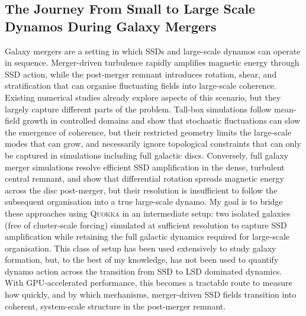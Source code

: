 \subsection{The Journey From Small to Large Scale Dynamos During Galaxy Mergers}

Galaxy mergers are a setting in which SSDs and large-scale dynamos can operate in sequence. Merger-driven turbulence rapidly amplifies magnetic energy through SSD action, while the post-merger remnant introduces rotation, shear, and stratification that can organise fluctuating fields into large-scale coherence. Existing numerical studies already explore aspects of this scenario, but they largely capture different parts of the problem. Tall-box simulations \citep[\eg][]{gent2023transition} follow mean-field growth in controlled domains and show that stochastic fluctuations can slow the emergence of coherence, but their restricted geometry limits the large-scale modes that can grow, and necessarily ignore topological constraints that can only be captured in simulations including full galactic discs. Conversely, full galaxy merger simulations \citep[\eg][]{whittingham2021impact, whittingham2023impact} resolve efficient SSD amplification in the dense, turbulent central remnant, and show that differential rotation spreads magnetic energy across the disc post-merger, but their resolution is insufficient to follow the subsequent organisation into a true large-scale dynamo. My goal is to bridge these approaches using \textsc{Quokka} in an intermediate setup: two isolated galaxies (free of cluster-scale forcing) simulated at sufficient resolution to capture SSD amplification while retaining the full galactic dynamics required for large-scale organisation. This class of setup has been used extensively to study galaxy formation, but, to the best of my knowledge, has not been used to quantify dynamo action across the transition from SSD to LSD dominated dynamics. With GPU-accelerated performance, this becomes a tractable route to measure how quickly, and by which mechanisms, merger-driven SSD fields transition into coherent, system-scale structure in the post-merger remnant.
